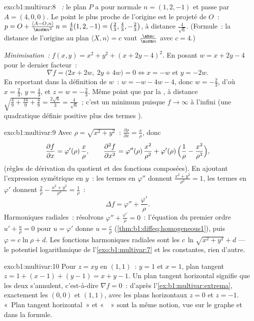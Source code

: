 \begin{solution}{exo:b1:multivar:8}
\emph{~:} le plan $P$ a pour normale $n = (1, 2, -1)$ et
passe par $A = (4, 0, 0)$. Le point le plus proche de l'origine est
le projeté de $O$~: $p = O + \frac{\langle A - O, n\rangle}{\norm
n^2}\,n = \frac{4}{6}(1,2,-1) = \bigl(\frac23, \frac43,
-\frac23\bigr)$, à distance $\frac{4}{\sqrt 6}$. (Formule~: la
distance de l'origine au plan $\langle X, n \rangle = c$ vaut
$\frac{\abs c}{\norm n}$ avec $c = 4$.)

\emph{Minimisation~:} $f(x,y) = x^2 + y^2 + (x + 2y - 4)^2$. En
posant $w = x + 2y - 4$ pour le dernier facteur~:
\[
\nabla f = \bigl(2x + 2w,\; 2y + 4w\bigr) = 0
\iff x = -w \text{ et } y = -2w .
\]
En reportant dans la définition de $w$~: $w = -w - 4w - 4$, donc $w =
-\frac23$, d'où $x = \frac23$, $y = \frac43$, et $z = w =
-\frac23$. Même point que par la , à distance
$\sqrt{\frac49 + \frac{16}{9} + \frac49} = \frac{2\sqrt 6}{3} =
\frac{4}{\sqrt6}$~; c'est un minimum puisque $f \to \infty$ à
l'infini (une quadratique définie positive plus des termes
).
\end{solution}

\begin{solution}{exo:b1:multivar:9}
Avec $\rho = \sqrt{x^2+y^2}$~: $\frac{\partial \rho}{\partial x} =
\frac{x}{\rho}$, donc
\[
\frac{\partial f}{\partial x} = \varphi'(\rho)\,\frac{x}{\rho},
\qquad
\frac{\partial^2 f}{\partial x^2}
= \varphi''(\rho)\,\frac{x^2}{\rho^2}
+ \varphi'(\rho)\,\Bigl(\frac{1}{\rho} -
\frac{x^2}{\rho^3}\Bigr),
\]
(règles de dérivation du quotient et des fonctions composées). En
ajoutant l'expression symétrique en $y$~: les termes en $\varphi''$
donnent $\frac{x^2 + y^2}{\rho^2} = 1$, les termes en $\varphi'$
donnent $\frac{2}{\rho} - \frac{x^2 +
y^2}{\rho^3} = \frac{1}{\rho}$~:
\[
\Delta f = \varphi'' + \frac{\varphi'}{\rho} .
\]
Harmoniques radiales~: résolvons $\varphi'' + \frac{\varphi'}{\rho}
= 0$~: l'équation du premier ordre $u' + \frac u\rho = 0$ pour $u =
\varphi'$ donne $u = \frac{c}{\rho}$
(\cref{thm:b1:diffeq:homogeneous1}), puis $\varphi = c\ln\rho + d$.
Les fonctions harmoniques radiales sont les
$c\,\ln\sqrt{x^2 + y^2} + d$ --- le potentiel logarithmique de
l'\cref{exo:b1:multivar:7} et les constantes, rien d'autre.
\end{solution}

\begin{solution}{exo:b1:multivar:10}
Pour $z = xy$ en $(1,1)$~:  $y = 1$ et $x = 1$,
plan tangent $z = 1 + (x - 1) + (y - 1) = x + y - 1$. Un plan
tangent horizontal signifie que les deux 
s'annulent, c'est-à-dire $\nabla f = 0$~: d'après
l'\cref{ex:b1:multivar:extrema}, exactement les 
$(0, 0)$ et $(1, 1)$, avec les plans horizontaux $z = 0$ et $z =
-1$. «~Plan tangent horizontal~» et «~~» sont la
même notion, vue sur le graphe et dans la formule.
\end{solution}

